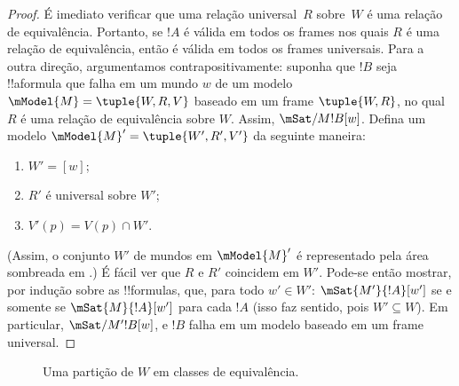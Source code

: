 \documentclass[../../../include/open-logic-section]{subfiles}
\begin{document}
\begin{proof}
  É imediato verificar que uma relação universal~$R$ sobre~$W$ é uma relação
  de equivalência. Portanto, se $!A$ é válida em todos os frames nos quais
  $R$ é uma relação de equivalência, então é válida em todos os frames
  universais. Para a outra direção, argumentamos contrapositivamente: suponha
  que $!B$ seja !!a{formula} que falha em um mundo $w$ de um modelo
  $\mModel{M} = \tuple{W, R, V}$ baseado em um frame $\tuple{W,R}$, no qual
  $R$ é uma relação de equivalência sobre $W$. Assim,
  $\mSat/{M}{!B}[w]$. Defina um modelo
  $\mModel{M}' = \tuple{W', R', V'}$ da seguinte maneira:
  \begin{enumerate}
  \item $W' = [w]$;
  \item $R'$ é universal sobre $W'$;
  \item $V'(p) = V(p) \cap W'$.
  \end{enumerate}
  (Assim, o conjunto $W'$ de mundos em $\mModel{M}'$ é representado pela
  área sombreada em .) É fácil ver que $R$ e $R'$
  coincidem em $W'$. Pode-se então mostrar, por indução sobre as !!{formula}s,
  que, para todo $w' \in W'$: $\mSat{M'}{!A}[w']$ se e somente se
  $\mSat{M}{!A}[w']$ para cada $!A$ (isso faz sentido, pois $W' \subseteq W$).
  Em particular, $\mSat/{M'}{!B}[w]$, e $!B$ falha em um modelo baseado em um
  frame universal.
\end{proof}

\begin{figure}[t]
  \centering
  \caption{Uma partição de $W$ em classes de equivalência.}
\end{figure}
\end{document}
